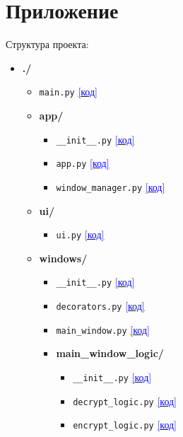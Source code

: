 \newpage
{}\label{sec:appendix}
\section*{Приложение}

\noindent Структура проекта:

\begin{itemize}
	\item \textbf{./}
	\begin{itemize}
		\item \texttt{main.py} \dotfill \hyperref[sec:main]{\textcolor{blue}{[код]}}
		\item \textbf{app/}
		\begin{itemize}
			\item \texttt{\_\_init\_\_.py} \dotfill \hyperref[sec:app_init]{\textcolor{blue}{[код]}}
			\item \texttt{app.py} \dotfill \hyperref[sec:app_app]{\textcolor{blue}{[код]}}
			\item \texttt{window\_manager.py} \dotfill \hyperref[sec:app_window_manager]{\textcolor{blue}{[код]}}
		\end{itemize}
		\item \textbf{ui/}
		\begin{itemize}
			\item \texttt{ui.py} \dotfill \hyperref[sec:ui_ui]{\textcolor{blue}{[код]}}
		\end{itemize}
		\item \textbf{windows/}
		\begin{itemize}
			\item \texttt{\_\_init\_\_.py} \dotfill \hyperref[sec:windows_init]{\textcolor{blue}{[код]}}
			\item \texttt{decorators.py} \dotfill \hyperref[sec:windows_decorators]{\textcolor{blue}{[код]}}
			\item \texttt{main\_window.py} \dotfill \hyperref[sec:windows_main_window]{\textcolor{blue}{[код]}}
			\item \textbf{main\_window\_logic/}
			\begin{itemize}
				\item \texttt{\_\_init\_\_.py} \dotfill \hyperref[sec:windows_logic_init]{\textcolor{blue}{[код]}}
				\item \texttt{decrypt\_logic.py} \dotfill \hyperref[sec:windows_logic_decrypt]{\textcolor{blue}{[код]}}
				\item \texttt{encrypt\_logic.py} \dotfill \hyperref[sec:windows_logic_encrypt]{\textcolor{blue}{[код]}}

\end{itemize}
\end{itemize}
\end{itemize}
\end{itemize}
